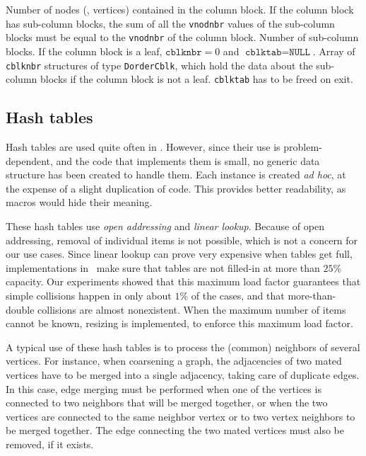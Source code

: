\begin{itemize}
\begin{itemize}
  \end{itemize}
  Number of nodes (\ie, vertices) contained in the column block. If
  the column block has sub-column blocks, the sum of all the
  \texttt{vnodnbr} values of the sub-column blocks must be equal to
  the \texttt{vnodnbr} of the column block.
  Number of sub-column blocks. If the column block is a leaf,
  $\texttt{cblknbr} = 0$ and $\texttt{cblktab} = \texttt{NULL}$.
  Array of \texttt{cblknbr} structures of type \texttt{DorderCblk},
  which hold the data about the sub-column blocks if the column block
  is not a leaf. \texttt{cblktab} has to be freed on exit.
\end{itemize}

\subsection{Hash tables}

Hash tables are used quite often in \scotch. However, since their use
is problem-dependent, and the code that implements them is small, no
generic data structure has been created to handle them. Each instance
is created \textit{ad hoc}, at the expense of a slight duplication of
code. This provides better readability, as macros would hide their
meaning.

These hash tables use \textit{open addressing} and \textit{linear
lookup}. Because of open addressing, removal of individual items is
not possible, which is not a concern for our use cases. Since linear
lookup can prove very expensive when tables get full, implementations
in \scotch\ make sure that tables are not filled-in at more than
$25$\% capacity. Our experiments showed that this maximum load factor
guarantees that simple collisions happen in only about $1$\% of the
cases, and that more-than-double collisions are almost
nonexistent. When the maximum number of items cannot be known,
resizing is implemented, to enforce this maximum load factor.

A typical use of these hash tables is to process the (common)
neighbors of several vertices. For instance, when coarsening a graph,
the adjacencies of two mated vertices have to be merged into a single
adjacency, taking care of duplicate edges. In this case, edge merging
must be performed when one of the vertices is connected to two
neighbors that will be merged together, or when the two vertices are
connected to the same neighbor vertex or to two vertex neighbors to
be merged together. The edge connecting the two mated vertices must
also be removed, if it exists.

